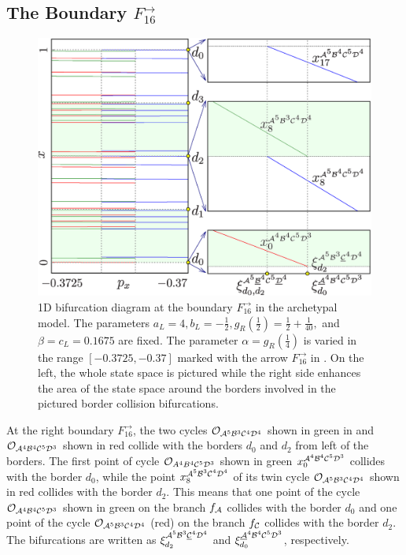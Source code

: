 \subsection{The Boundary $F_{16}^\rightarrow$}
\label{sec:arch.bif.R}

\begin{figure}
	\centering
	\includegraphics[width=.7 \textwidth]{../Figures/6/6.7/result.png}
	\caption[1D bifurcation diagram at the boundary $F_{16}^\rightarrow$ in the archetypal model]{
		1D bifurcation diagram at the boundary $F_{16}^\rightarrow$ in the archetypal model.
		The parameters $a_L = 4, b_L = -\frac{1}{2}, g_R\left(\frac{1}{2}\right) = \frac{1}{2} + \frac{1}{40},$ and $\beta = c_L = 0.1675$ are fixed.
		The parameter $\alpha = g_R\left(\frac{1}{4}\right)$ is varied in the range $[-0.3725, -0.37]$ marked with the arrow $F_{16}^\rightarrow$ in .
		On the left, the whole state space is pictured while the right side enhances the area of the state space around the borders involved in the pictured border collision bifurcations.
	}
	\label{fig:arch.bif.F.right}
\end{figure}

At the right boundary $F_{16}^\rightarrow$, the two cycles $\mathcal{O}_{\mathcal{A}^5\mathcal{B}^3\mathcal{C}^4\mathcal{D}^4}$ shown in green in  and $\mathcal{O}_{\mathcal{A}^4\mathcal{B}^4\mathcal{C}^5\mathcal{D}^3}$ shown in red collide with the borders $d_0$ and $d_2$ from left of the borders.
The first point of cycle $\mathcal{O}_{A^4B^4\mathcal{C}^5\mathcal{D}^3}$ shown in green $x_{0}^{\mathcal{A}^4\mathcal{B}^4\mathcal{C}^5\mathcal{D}^3}$ collides with the border $d_0$, while the point $x_{8}^{\mathcal{A}^5\mathcal{B}^3\mathcal{C}^4\mathcal{D}^4}$ of its twin cycle $\mathcal{O}_{\mathcal{A}^5\mathcal{B}^3\mathcal{C}^4\mathcal{D}^4}$ shown in red collides with the border $d_2$.
This means that one point of the cycle $\mathcal{O}_{\mathcal{A}^4\mathcal{B}^4\mathcal{C}^5\mathcal{D}^3}$ shown in green on the branch $f_{\mathcal{A}}$ collides with the border $d_0$ and one point of the cycle $\mathcal{O}_{\mathcal{A}^5\mathcal{B}^3\mathcal{C}^4\mathcal{D}^4}$ (red) on the branch $f_{\mathcal{C}}$ collides with the border $d_2$.
The bifurcations are written as $\xi_{d_2}^{\mathcal{A}^5\mathcal{B}^3\underline{\mathcal{C}}^4\mathcal{D}^4}$ and $\xi_{d_0}^{\underline{\mathcal{A}}^4\mathcal{B}^4\mathcal{C}^5\mathcal{D}^3}$, respectively.

